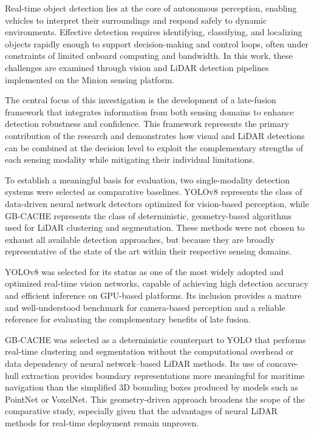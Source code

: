 \documentclass{erauthesis}
\begin{document}



Real-time object detection lies at the core of autonomous perception, enabling vehicles to interpret their surroundings and respond safely to dynamic environments.
Effective detection requires identifying, classifying, and localizing objects rapidly enough to support decision-making and control loops, often under constraints of limited onboard computing and bandwidth.
In this work, these challenges are examined through vision and LiDAR detection pipelines implemented on the Minion sensing platform.

The central focus of this investigation is the development of a late-fusion framework that integrates information from both sensing domains to enhance detection robustness and confidence.
This framework represents the primary contribution of the research and demonstrates how visual and LiDAR detections can be combined at the decision level to exploit the complementary strengths of each sensing modality while mitigating their individual limitations.

To establish a meaningful basis for evaluation, two single-modality detection systems were selected as comparative baselines.
YOLOv8 represents the class of data-driven neural network detectors optimized for vision-based perception, while GB-CACHE represents the class of deterministic, geometry-based algorithms used for LiDAR clustering and segmentation.
These methods were not chosen to exhaust all available detection approaches, but because they are broadly representative of the state of the art within their respective sensing domains.

YOLOv8 was selected for its status as one of the most widely adopted and optimized real-time vision networks, capable of achieving high detection accuracy and efficient inference on GPU-based platforms.
Its inclusion provides a mature and well-understood benchmark for camera-based perception and a reliable reference for evaluating the complementary benefits of late fusion.

GB-CACHE was selected as a deterministic counterpart to YOLO that performs real-time clustering and segmentation without the computational overhead or data dependency of neural network–based LiDAR methods.
Its use of concave-hull extraction provides boundary representations more meaningful for maritime navigation than the simplified 3D bounding boxes produced by models such as PointNet or VoxelNet.
This geometry-driven approach broadens the scope of the comparative study, especially given that the advantages of neural LiDAR methods for real-time deployment remain unproven.
\end{document}
